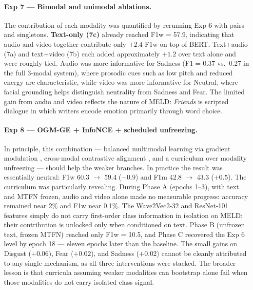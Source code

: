 \documentclass[11pt,twocolumn]{article}
\begin{document}
\paragraph{Exp 7 --- Bimodal and unimodal ablations.} The contribution of each modality was quantified by rerunning Exp 6 with pairs and singletons. \textbf{Text-only (7c)} already reached F1w = 57.9, indicating that audio and video together contribute only $+2.4$ F1w on top of BERT. Text+audio (7a) and text+video (7b) each added approximately $+1.2$ over text alone and were roughly tied. Audio was more informative for Sadness (F1 = 0.37 vs.\ 0.27 in the full 3-modal system), where prosodic cues such as low pitch and reduced energy are characteristic, while video was more informative for Neutral, where facial grounding helps distinguish neutrality from Sadness and Fear. The limited gain from audio and video reflects the nature of MELD: \emph{Friends} is scripted dialogue in which writers encode emotion primarily through word choice.

\paragraph{Exp 8 --- OGM-GE + InfoNCE + scheduled unfreezing.} In principle, this combination --- balanced multimodal learning via gradient modulation \citep{peng2022ogmge}, cross-modal contrastive alignment \citep{vandenoord2018cpc}, and a curriculum over modality unfreezing --- should help the weaker branches. In practice the result was essentially neutral: F1w 60.3 $\to$ 59.4 ($-0.9$) and F1m 42.8 $\to$ 43.3 ($+0.5$). The curriculum was particularly revealing. During Phase A (epochs 1--3), with text and MTFN frozen, audio and video alone made no measurable progress: accuracy remained near 2\% and F1w near 0.1\%. The Wave2Vec2-32 and ResNet-101 features simply do not carry first-order class information in isolation on MELD; their contribution is unlocked only when conditioned on text. Phase B (unfrozen text, frozen MTFN) reached only F1w = 10.5, and Phase C recovered the Exp 6 level by epoch 18 --- eleven epochs later than the baseline. The small gains on Disgust ($+0.06$), Fear ($+0.02$), and Sadness ($+0.02$) cannot be cleanly attributed to any single mechanism, as all three interventions were stacked. The broader lesson is that curricula assuming weaker modalities can bootstrap alone fail when those modalities do not carry isolated class signal.
\end{document}
